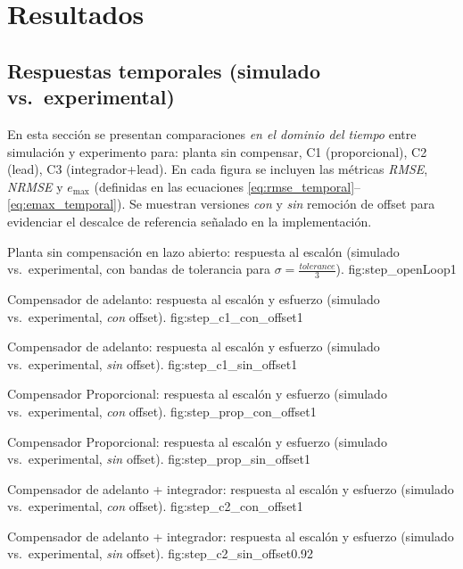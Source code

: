 \section{Resultados}

\subsection{Respuestas temporales (simulado vs.\ experimental)}
En esta sección se presentan comparaciones \emph{en el dominio del tiempo} entre simulación y experimento para: planta sin compensar, C1 (proporcional), C2 (lead), C3 (integrador+lead). En cada figura se incluyen las métricas \emph{RMSE}, \emph{NRMSE} y \(e_{\max}\) (definidas en las ecuaciones \eqref{eq:rmse_temporal}–\eqref{eq:emax_temporal}). Se muestran versiones \emph{con} y \emph{sin} remoción de offset para evidenciar el descalce de referencia señalado en la implementación.

{Planta sin compensación en lazo abierto: respuesta al escalón (simulado vs.\ experimental, con bandas de tolerancia para \(\sigma = \frac{tolerance}{3}\)).}
{fig:step_openLoop}{1}



{Compensador de adelanto: respuesta al escalón y esfuerzo (simulado vs.\ experimental, \emph{con} offset).}
{fig:step_c1_con_offset}{1}

{Compensador de adelanto: respuesta al escalón y esfuerzo (simulado vs.\ experimental, \emph{sin} offset).}
{fig:step_c1_sin_offset}{1}

{Compensador Proporcional: respuesta al escalón y esfuerzo (simulado vs.\ experimental, \emph{con} offset).}
{fig:step_prop_con_offset}{1}

{Compensador Proporcional: respuesta al escalón y esfuerzo (simulado vs.\ experimental, \emph{sin} offset).}
{fig:step_prop_sin_offset}{1}

{Compensador de adelanto + integrador: respuesta al escalón y esfuerzo (simulado vs.\ experimental, \emph{con} offset).}
{fig:step_c2_con_offset}{1}

{Compensador de adelanto + integrador: respuesta al escalón y esfuerzo (simulado vs.\ experimental, \emph{sin} offset).}
{fig:step_c2_sin_offset}{0.92}



